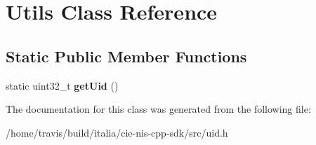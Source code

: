 \hypertarget{classUtils}{\section{Utils Class Reference}
\label{classUtils}
}
\subsection*{Static Public Member Functions}
\begin{DoxyCompactItemize}
\item 
\hypertarget{classUtils_a530a848112e369976fe29b2310eb3302}{static uint32\-\_\-t {\bfseries get\-Uid} ()}\label{classUtils_a530a848112e369976fe29b2310eb3302}

\end{DoxyCompactItemize}


The documentation for this class was generated from the following file\-:\begin{DoxyCompactItemize}
\item 
/home/travis/build/italia/cie-\/nis-\/cpp-\/sdk/src/uid.\-h\end{DoxyCompactItemize}
